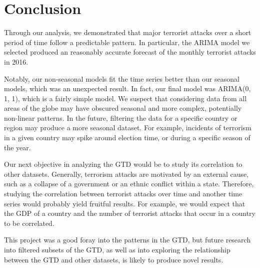 \documentclass[11pt]{paper}
\begin{document}



\section{Conclusion}
Through our analysis, we demonstrated that major terrorist attacks over a short period of time follow a predictable pattern. In particular, the ARIMA model we selected produced an reasonably accurate forecast of the monthly terrorist attacks in 2016.

Notably, our non-seasonal models fit the time series better than our seasonal models, which was an unexpected result. In fact, our final model was ARIMA(0, 1, 1), which is a fairly simple model. We suspect that considering data from all areas of the globe may have obscured seasonal and more complex, potentially non-linear patterns. In the future, filtering the data for a specific country or region may produce a more seasonal dataset. For example, incidents of terrorism in a given country may spike around election time, or during a specific season of the year.

Our next objective in analyzing the GTD would be to study its correlation to other datasets. Generally, terrorism attacks are motivated by an external cause, such as a collapse of a government or an ethnic conflict within a state. Therefore, studying the correlation between terrorist attacks over time and another time series would probably yield fruitful results. For example, we would expect that the GDP of a country and the number of terrorist attacks that occur in a country to be correlated.

This project was a good foray into the patterns in the GTD, but future research into filtered subsets of the GTD, as well as into exploring the relationship between the GTD and other datasets, is likely to produce novel results.

\printbibliography
\end{document}
